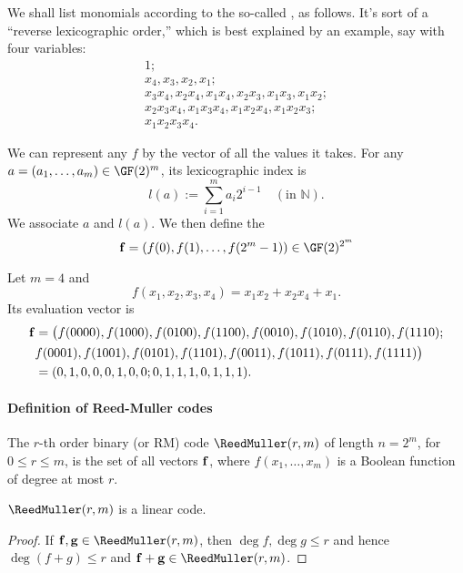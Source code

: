 \documentclass[a4paper, 11pt, openany]{book}
\begin{document}
We shall list monomials according to the so-called , as follows. It's sort of a ``reverse lexicographic order,'' which is best explained by an example, say with four variables:
\begin{align*}
    1;\\
    x_4, x_3, x_2, x_1;\\
    x_3 x_4, x_2 x_4, x_1 x_4, x_2 x_3, x_1 x_3, x_1 x_2;\\
    x_2 x_3 x_4, x_1 x_3 x_4, x_1 x_2 x_4, x_1 x_2 x_3;\\
    x_1x_2x_3x_4.
\end{align*}

We can represent any $f$ by the vector of all the values it takes. For any $a = (a_1, \dots, a_m) \in \GF(2)^m$, its lexicographic index is
\[
	l(a) := \sum_{i=1}^m a_i 2^{i-1} \quad (\text{in } \mathbb{N}).
\]
We associate $a$ and $l(a)$. We then define the 
\[
    {\bf f} = (f(0), f(1), \dots, f(2^m-1)) \in \GF(2)^{2^m}
\]


\begin{example}
Let $m = 4$ and
\[
    f(x_1, x_2, x_3, x_4) = x_1x_2 + x_2x_4 + x_1.
\]
Its evaluation vector is
\begin{align*}
    {\bf f} &= \big( f(0000), f(1000), f(0100), f(1100), f(0010), f(1010), f(0110), f(1110);\\
    & f(0001), f(1001), f(0101), f(1101), f(0011), f(1011), f(0111), f(1111) \big)\\
    &= ( 0, 1, 0, 0, 0, 1, 0, 0; 0, 1, 1, 1, 0, 1, 1, 1 ).
\end{align*}
\end{example}

\paragraph{Definition of Reed-Muller codes}
The $r$-th order binary  (or RM) code $\ReedMuller(r,m)$ of length $n = 2^m$, for $0 \le r \le m$, is the set of all vectors ${\bf f}$, where $f(x_1, \dots, x_m)$ is a Boolean function of degree at most $r$.

\begin{lemma}
$\ReedMuller(r,m)$ is a linear code.
\end{lemma}

\begin{proof}
If ${\bf f}, {\bf g} \in \ReedMuller(r,m)$, then $\deg f, \deg g \le r$ and hence $\deg (f+g) \le r$ and ${\bf f} + {\bf g} \in \ReedMuller(r,m)$.
\end{proof}
\end{document}
